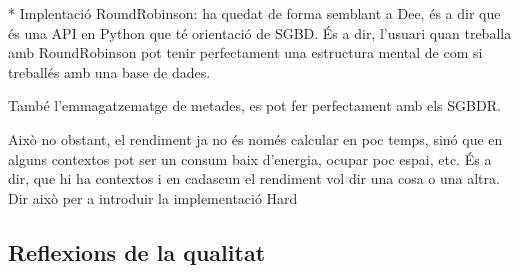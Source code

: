 * Implentació RoundRobinson: ha quedat de forma semblant a Dee, és a dir que és una API en Python que té orientació de \gls{SGBD}. És a dir, l'usuari quan treballa amb RoundRobinson pot tenir perfectament una estructura mental de com si treballés amb una base de dades.



També l'emmagatzematge de metades, es  pot fer perfectament amb els SGBDR.

Això no obstant, el rendiment ja no és només calcular en poc temps, sinó que en alguns contextos pot ser un consum baix d'energia, ocupar poc espai, etc.
És a dir, que hi ha contextos i en cadascun el rendiment vol dir una cosa o una altra. Dir això per a introduir la implementació Hard

\subsection{Reflexions de la qualitat}








